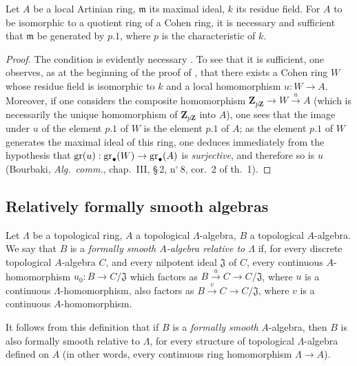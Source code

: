 \begin{proposition}[19.8.11]
\label{0.19.8.11}
Let $A$ be a local Artinian ring, $\mathfrak{m}$ its maximal ideal, $k$ its residue field.
For $A$ to be isomorphic to a quotient ring of a Cohen ring, it is necessary and sufficient that $\mathfrak{m}$ be generated by $p.1$, where $p$ is the characteristic of $k$.
\end{proposition}

\begin{proof}
The condition is evidently necessary .
To see that it is sufficient, one observes, as at the beginning of the proof of , that there exists a Cohen ring $W$ whose residue field is isomorphic to $k$ and a local homomorphism $u:W\to A$.
Moreover, if one considers the composite homomorphism $\mathbf{Z}_{p\mathbf{Z}}\to W\xrightarrow{u}A$ (which is necessarily the unique homomorphism of $\mathbf{Z}_{p\mathbf{Z}}$ into $A$), one sees that the image under $u$ of the element $p.1$ of $W$ is the element $p.1$ of $A$; as the element $p.1$ of $W$ generates the maximal ideal of this ring, one deduces immediately from the hypothesis that $\operatorname{gr}(u):\operatorname{gr}_\bullet(W)\to\operatorname{gr}_\bullet(A)$ is \emph{surjective}, and therefore so is $u$ (Bourbaki, \emph{Alg.\ comm.}, chap.~III, \S\,2, n$^\circ$\,8, cor.~2 of th.~1).
\end{proof}

\subsection{Relatively formally smooth algebras}
\label{subsection:0.19.9}

\begin{definition}[19.9.1]
\label{0.19.9.1}
Let $\Lambda$ be a topological ring, $A$ a topological $\Lambda$-algebra, $B$ a topological $A$-algebra.
We say that $B$ is a \emph{formally smooth $A$-algebra relative to $\Lambda$} if, for every discrete topological $A$-algebra $C$, and every nilpotent ideal $\mathfrak{J}$ of $C$, every continuous $A$-homomorphism $u_0:B\to C/\mathfrak{J}$ which factors as $B\xrightarrow{u}C\to C/\mathfrak{J}$, where $u$ is a continuous \textup{$\Lambda$-homomorphism}, also factors as $B\xrightarrow{v}C\to C/\mathfrak{J}$, where $v$ is a continuous \textup{$A$-homomorphism}.
\end{definition}

It follows from this definition that if $B$ is a \emph{formally smooth} $A$-algebra, then $B$ is also formally smooth relative to $\Lambda$, for every structure of topological $\Lambda$-algebra defined on $A$ (in other words, every continuous ring homomorphism $\Lambda\to A$).

